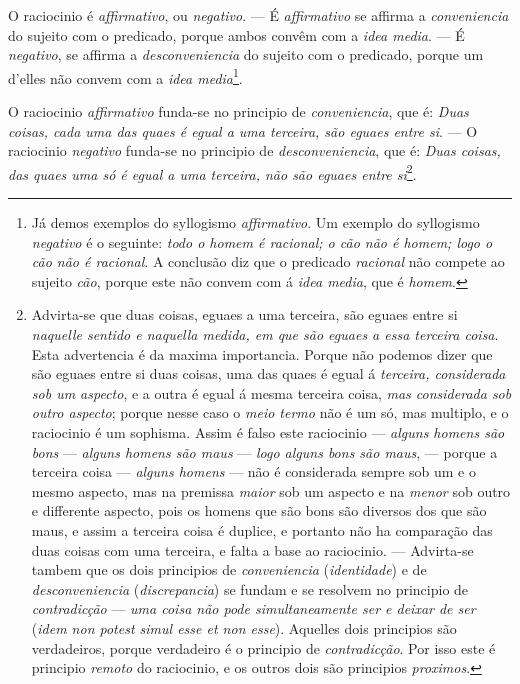  O raciocinio é \emph{affirmativo}, ou \emph{negativo}.
--- É \emph{affirmativo} se affirma a \emph{conveniencia} do sujeito com o predicado,
porque ambos convêm com a \emph{idea media}. --- É \emph{negativo}, se affirma a
\emph{desconveniencia} do sujeito com o predicado, porque um d'elles não convem com a
\emph{idea media}\footnote{Já demos exemplos do syllogismo \emph{affirmativo}. Um exemplo
do syllogismo \emph{negativo} é o seguinte: \emph{todo o homem é racional; o cão não é
homem; logo o cão não é racional}. A conclusão diz que o predicado \emph{racional} não
compete ao sujeito \emph{cão}, porque este não convem com á \emph{idea media}, que é
\emph{homem}.}.

 O raciocinio
\emph{affirmativo} funda-se no principio de \emph{conveniencia}, que é: \emph{Duas coisas,
cada uma das quaes é egual a uma terceira, são eguaes entre si}. --- O raciocinio
\emph{negativo} funda-se no principio de \emph{desconveniencia}, que é: \emph{Duas coisas,
das quaes uma só é egual a uma terceira, não são eguaes entre si}\footnote{Advirta-se que
duas coisas, eguaes a uma terceira, são eguaes entre si \emph{naquelle sentido e naquella
medida, em que são eguaes a essa terceira coisa}. Esta advertencia é da maxima
importancia. Porque não podemos dizer que são eguaes entre si duas coisas, uma das quaes
é egual á \emph{terceira, considerada sob um aspecto}, e a outra é egual á mesma terceira
coisa, \emph{mas considerada sob outro aspecto}; porque nesse caso o \emph{meio termo} não
é um só, mas multiplo, e o raciocinio é um sophisma. Assim é falso este raciocinio ---
\emph{alguns homens são bons} --- \emph{alguns homens são maus} --- \emph{logo alguns bons
são maus}, --- porque a terceira coisa --- \emph{alguns homens} --- não é considerada
sempre sob um e o mesmo aspecto, mas na premissa \emph{maior} sob um aspecto e na
\emph{menor} sob outro e differente aspecto, pois os homens que são bons são diversos dos
que são maus, e assim a terceira coisa é duplice, e portanto não ha comparação das duas
coisas com uma terceira, e falta a base ao raciocinio. --- Advirta-se tambem que os dois
principios de \emph{conveniencia} (\emph{identidade}) e de \emph{desconveniencia}
(\emph{discrepancia}) se fundam e se resolvem no principio de \emph{contradicção} ---
\emph{uma coisa não pode simultaneamente ser e deixar de ser} (\emph{idem non potest simul
esse et non esse}). Aquelles dois principios são verdadeiros, porque verdadeiro é o
principio de \emph{contradicção}. Por isso este é principio \emph{remoto} do raciocinio, e
os outros dois são principios \emph{proximos}.}.

